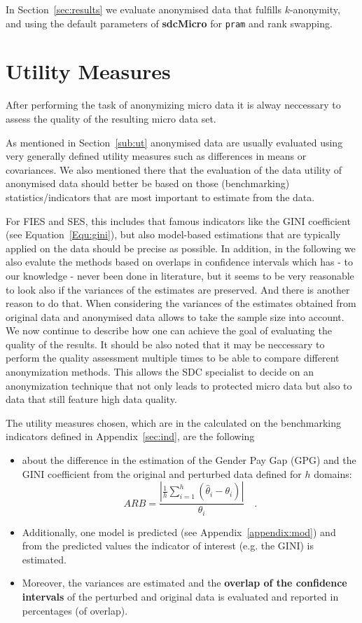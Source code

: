\documentclass[12pt]{article}
\newcommand{\pkg}[1]{\textbf{#1}}
\begin{document}
In Section~\ref{sec:results} we evaluate anonymised data that fulfills $k$-anonymity, and using the default parameters 
of \pkg{sdcMicro} for \lstinline{pram} and rank swapping.


\section{Utility Measures} \label{sec:utility2}
After performing the task of anonymizing micro data it is alway neccessary to
assess the quality of the resulting micro data set. 

As mentioned in Section~\ref{sub:ut} anonymised data are usually 
evaluated using very generally defined utility measures such as differences in means or covariances.
We also mentioned there that the evaluation of the data utility of anonymised data should better be 
based on those (benchmarking) statistics/indicators that are most important to estimate from the data. 

For FIES and SES, this includes that famous indicators like the GINI coefficient (see Equation~\ref{Equ:gini}),
but also model-based estimations that are typically applied on the data should be precise as possible.
In addition, in the following we also evalute the methods based on overlaps in confidence intervals which 
has - to our knowledge - never been done in literature, but it seems to be very reasonable to look also if the variances of 
the estimates are preserved.
And there is another reason to do that. When considering the variances of the estimates obtained from original data and anonymised data allows 
to take the sample size into account. \\


We now continue to describe
how one can achieve the goal of evaluating the quality of the results. It should
be also noted that it may be neccessary to perform the quality assessment
multiple times to be able to compare different anonymization methods. This
allows the SDC specialist to decide on an anonymization technique that not only
leads to protected micro data but also to data that still feature high data
quality.


The utility measures chosen, which are in the calculated on the benchmarking indicators defined in
Appendix~\ref{sec:ind}, are the following 
\begin{itemize}
  \item about the difference in the estimation of the Gender Pay Gap (GPG)
and the GINI coefficient from the original and perturbed data defined for $h$ domains:
\begin{equation}
ARB = \frac{|\frac{1}{h} \sum_{i=1}^{h} (\hat{\theta}_i - \theta_i)|}{\theta_i}
\quad.
\end{equation}
\item
Additionally, one model is
predicted (see Appendix~\ref{appendix:mod}) and from the predicted values the 
indicator of interest (e.g. the GINI) is 
estimated.
\item
Moreover, the variances are estimated and the \textbf{overlap of the confidence
intervals} of the perturbed and original data is evaluated and reported in
percentages (of overlap).
\end{itemize}
\end{document}
